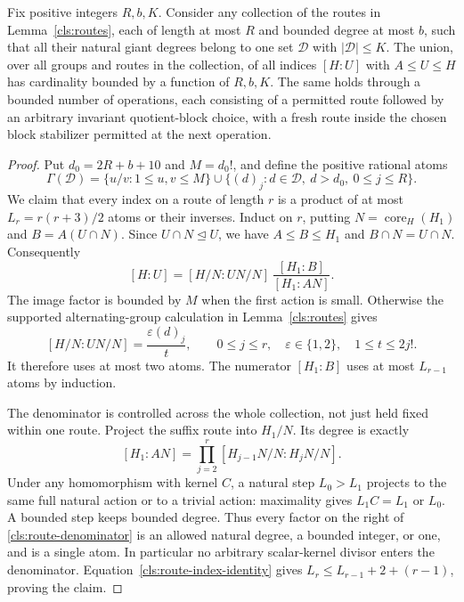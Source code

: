 \begin{lemma}\label{cls:index-recipes}
Fix positive integers $R,b,K$.  Consider any collection of the
routes in Lemma~\ref{cls:routes}, each of length at most $R$ and
bounded degree at most $b$, such that all their natural giant
degrees belong to one set $\mathcal D$ with $|\mathcal D|\leq K$.
The union, over all groups and routes in the collection, of all
indices $[H:U]$ with $A\leq U\leq H$ has cardinality bounded by a
function of $R,b,K$.  The same holds through a bounded number of
operations, each consisting of a permitted route followed by an
arbitrary invariant quotient-block choice, with a fresh route
inside the chosen block stabilizer permitted at the next operation.
\end{lemma}
\begin{proof}
Put $d_0=2R+b+10$ and $M=d_0!$, and define the positive rational
atoms
\[
 \Gamma(\mathcal D)=
 \{u/v:1\leq u,v\leq M\}
 \cup\{(d)_j:d\in\mathcal D,\ d>d_0,\ 0\leq j\leq R\}.
\]
We claim that every index on a route of length $r$ is a product of
at most $L_r=r(r+3)/2$ atoms or their inverses.  Induct on $r$,
putting $N=\operatorname{core}_H(H_1)$ and
$B=A(U\cap N)$.  Since $U\cap N\trianglelefteq U$, we have
$A\leq B\leq H_1$ and $B\cap N=U\cap N$.  Consequently
\begin{equation}\label{cls:route-index-identity}
 [H:U]=[H/N:UN/N]\,
        \frac{[H_1:B]}{[H_1:AN]}.
\end{equation}
The image factor is bounded by $M$ when the first action is small.
Otherwise the supported alternating-group calculation in
Lemma~\ref{cls:routes} gives
\[
 [H/N:UN/N]=\frac{\varepsilon(d)_j}{t},\qquad
 0\leq j\leq r,\quad \varepsilon\in\{1,2\},\quad1\leq t\leq2j!.
\]
It therefore uses at most two atoms.  The numerator $[H_1:B]$
uses at most $L_{r-1}$ atoms by induction.

The denominator is controlled across the whole collection, not
just held fixed within one route.  Project the suffix route into
$H_1/N$.  Its degree is exactly
\begin{equation}\label{cls:route-denominator}
 [H_1:AN]=\prod_{j=2}^{r}
 [H_{j-1}N/N:H_jN/N].
\end{equation}
Under any homomorphism with kernel $C$, a natural step $L_0>L_1$
projects to the same full natural action or to a trivial action:
maximality gives $L_1C=L_1$ or $L_0$.  A bounded step keeps bounded
degree.  Thus every factor on the right of
\eqref{cls:route-denominator} is an allowed natural degree, a
bounded integer, or one, and is a single atom.  In particular no
arbitrary scalar-kernel divisor enters the denominator.
Equation~\eqref{cls:route-index-identity} gives
$L_r\leq L_{r-1}+2+(r-1)$, proving the claim.


\end{proof}
